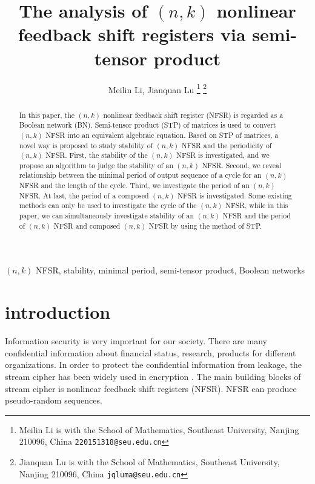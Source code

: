 \documentclass[conference]{IEEEtran}
\title{\LARGE \bf
The analysis of $(n,k)$ nonlinear feedback shift registers via semi-tensor product}
\author{Meilin Li, Jianquan Lu
\thanks{Meilin Li is with the School of Mathematics, Southeast
University, Nanjing 210096, China {\tt\small 220151318@seu.edu.cn}}
\thanks{Jianquan Lu is with the School of Mathematics, Southeast
University, Nanjing 210096, China
{\tt\small jqluma@seu.edu.cn}}}
\begin{document}
\maketitle
\thispagestyle{empty}
\pagestyle{empty}

\begin{abstract}
In this paper, the $(n,k)$ nonlinear feedback shift register (NFSR) is regarded as a Boolean network (BN). Semi-tensor product (STP) of matrices is used to convert $(n,k)$ NFSR into an equivalent algebraic equation. Based on STP of matrices, a novel way is proposed to study stability of $(n,k)$ NFSR and the periodicity of $(n,k)$ NFSR. First, the stability of the $(n,k)$ NFSR is investigated, and we propose an algorithm to judge the stability of an $(n,k)$ NFSR. Second, we reveal relationship between the minimal period of output sequence of a cycle for an $(n,k)$ NFSR and the length of the cycle. Third, we investigate the period of an $(n,k)$ NFSR. At last, the period of a composed $(n,k)$ NFSR is investigated. Some existing methods can only be used to investigate the cycle of the $(n,k)$ NFSR, while in this paper, we can simultaneously investigate stability of an $(n,k)$ NFSR and the period of $(n,k)$ NFSR and composed $(n,k)$ NFSR by using the method of STP.
\end{abstract}

\begin{keywords}
$(n,k)$ NFSR, stability, minimal period, semi-tensor product, Boolean networks
\end{keywords}

\section{introduction}
Information security is very important for our society. There are many confidential information about financial status, research, products for different organizations. In order to protect the confidential information from leakage, the stream cipher has been widely used in encryption \cite{Golomb2002Shift}. The main building blocks of stream cipher is nonlinear feedback shift registers (NFSR). NFSR can produce pseudo-random sequences.
\end{document}

